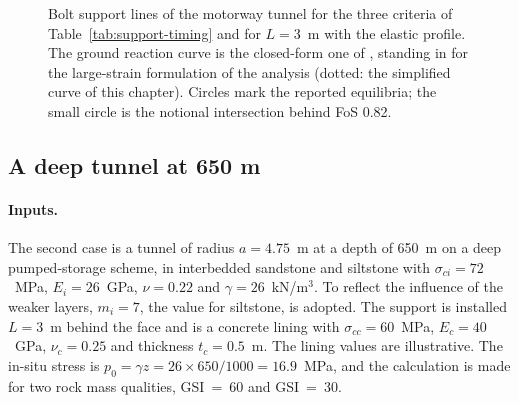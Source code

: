 \begin{figure}[htbp]
\centering
{}
\caption{Bolt support lines of the motorway tunnel for the three criteria of Table~\ref{tab:support-timing} and for $L = 3$~m with the elastic profile. The ground reaction curve is the closed-form one of \citet{duncanfama1993}, standing in for the large-strain formulation of the analysis (dotted: the simplified curve of this chapter). Circles mark the reported equilibria; the small circle is the notional intersection behind FoS 0.82.}
\label{fig:motorway-timing}
\end{figure}

\subsection{A deep tunnel at 650 m}
\label{sec:ccm-worked-example-section}

\paragraph{Inputs.}
The second case is a tunnel of radius $a = 4.75$~m at a depth of 650~m on a
deep pumped-storage scheme, in interbedded sandstone and siltstone with
$\sigma_{ci}=72$~MPa, $E_i=26$~GPa, $\nu = 0.22$ and
$\gamma=26$~kN/m$^3$. To reflect the influence of the weaker layers,
$m_i = 7$, the value for siltstone, is adopted. The support is installed
$L=3$~m behind the face and is a concrete lining with
$\sigma_{cc} = 60$~MPa, $E_c = 40$~GPa, $\nu_c = 0.25$ and thickness
$t_c = 0.5$~m. The lining values are illustrative. The in-situ stress is
$p_0 = \gamma z = 26 \times 650/1000 = 16.9$~MPa, and the calculation is
made for two rock mass qualities, GSI~=~60 and GSI~=~30.

